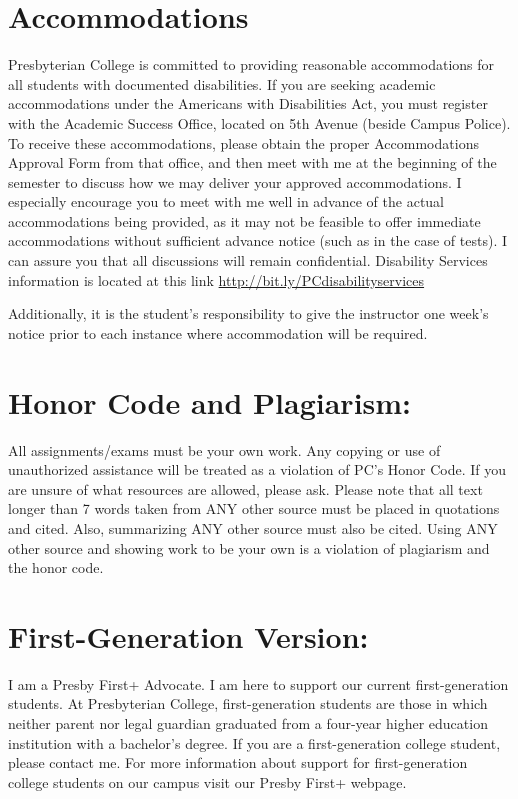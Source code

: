\documentclass[
]{book}
\begin{document}
\hypertarget{accommodations}{%
\section{Accommodations}\label{accommodations}}

Presbyterian College is committed to providing reasonable accommodations for all students with documented disabilities. If you are seeking academic accommodations under the Americans with Disabilities Act, you must register with the Academic Success Office, located on 5th Avenue (beside Campus Police). To receive these accommodations, please obtain the proper Accommodations Approval Form from that office, and then meet with me at the beginning of the semester to discuss how we may deliver your approved accommodations. I especially encourage you to meet with me well in advance of the actual accommodations being provided, as it may not be feasible to offer immediate accommodations without sufficient advance notice (such as in the case of tests). I can assure you that all discussions will remain confidential. Disability Services information is located at this link \url{http://bit.ly/PCdisabilityservices}

Additionally, it is the student's responsibility to give the instructor one week's notice prior to each instance where accommodation will be required.

\hypertarget{honor-code-and-plagiarism}{%
\section{Honor Code and Plagiarism:}\label{honor-code-and-plagiarism}}

All assignments/exams must be your own work. Any copying or use of unauthorized assistance will be treated as a violation of PC's Honor Code. If you are unsure of what resources are allowed, please ask. Please note that all text longer than 7 words taken from ANY other source must be placed in quotations and cited. Also, summarizing ANY other source must also be cited. Using ANY other source and showing work to be your own is a violation of plagiarism and the honor code.

\hypertarget{first-generation-version}{%
\section{First-Generation Version:}\label{first-generation-version}}

I am a Presby First+ Advocate. I am here to support our current first-generation students. At Presbyterian College, first-generation students are those in which neither parent nor legal guardian graduated from a four-year higher education institution with a bachelor's degree. If you are a first-generation college student, please contact me. For more information about support for first-generation college students on our campus visit our Presby First+ webpage.
\end{document}

